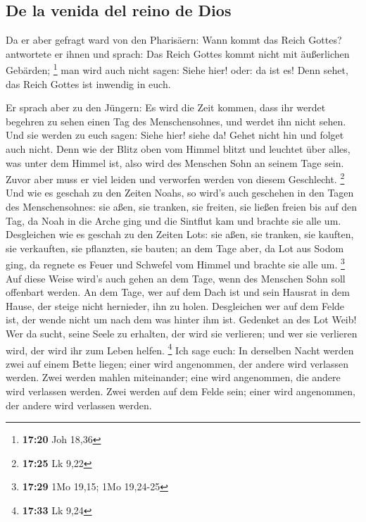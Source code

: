 \hypertarget{de-la-venida-del-reino-de-dios}{%
\subsection{De la venida del reino de
Dios}\label{de-la-venida-del-reino-de-dios}}

 Da er aber gefragt ward von den Pharisäern: Wann kommt
das Reich Gottes? antwortete er ihnen und sprach: Das Reich Gottes kommt
nicht mit äußerlichen Gebärden; \footnote{\textbf{17:20} Joh 18,36}
 man wird auch nicht sagen: Siehe hier! oder: da ist es!
Denn sehet, das Reich Gottes ist inwendig in euch.

 Er sprach aber zu den Jüngern: Es wird die Zeit kommen,
dass ihr werdet begehren zu sehen einen Tag des Menschensohnes, und
werdet ihn nicht sehen.  Und sie werden zu euch sagen:
Siehe hier! siehe da! Gehet nicht hin und folget auch nicht.
 Denn wie der Blitz oben vom Himmel blitzt und leuchtet
über alles, was unter dem Himmel ist, also wird des Menschen Sohn an
seinem Tage sein.  Zuvor aber muss er viel leiden und
verworfen werden von diesem Geschlecht. \footnote{\textbf{17:25} Lk 9,22}
 Und wie es geschah zu den Zeiten Noahs, so wird's auch
geschehen in den Tagen des Menschensohnes:  sie aßen, sie
tranken, sie freiten, sie ließen freien bis auf den Tag, da Noah in die
Arche ging und die Sintflut kam und brachte sie alle um. 
Desgleichen wie es geschah zu den Zeiten Lots: sie aßen, sie tranken,
sie kauften, sie verkauften, sie pflanzten, sie bauten; 
an dem Tage aber, da Lot aus Sodom ging, da regnete es Feuer und
Schwefel vom Himmel und brachte sie alle um. \footnote{\textbf{17:29}
  1Mo 19,15; 1Mo 19,24-25}  Auf diese Weise wird's auch
gehen an dem Tage, wenn des Menschen Sohn soll offenbart werden.
 An dem Tage, wer auf dem Dach ist und sein Hausrat in
dem Hause, der steige nicht hernieder, ihn zu holen. Desgleichen wer auf
dem Felde ist, der wende nicht um nach dem was hinter ihm ist.
 Gedenket an des Lot Weib!  Wer da sucht,
seine Seele zu erhalten, der wird sie verlieren; und wer sie verlieren
wird, der wird ihr zum Leben helfen. \footnote{\textbf{17:33} Lk 9,24}
 Ich sage euch: In derselben Nacht werden zwei auf einem
Bette liegen; einer wird angenommen, der andere wird verlassen werden.
 Zwei werden mahlen miteinander; eine wird angenommen,
die andere wird verlassen werden.  Zwei werden auf dem
Felde sein; einer wird angenommen, der andere wird verlassen werden.


